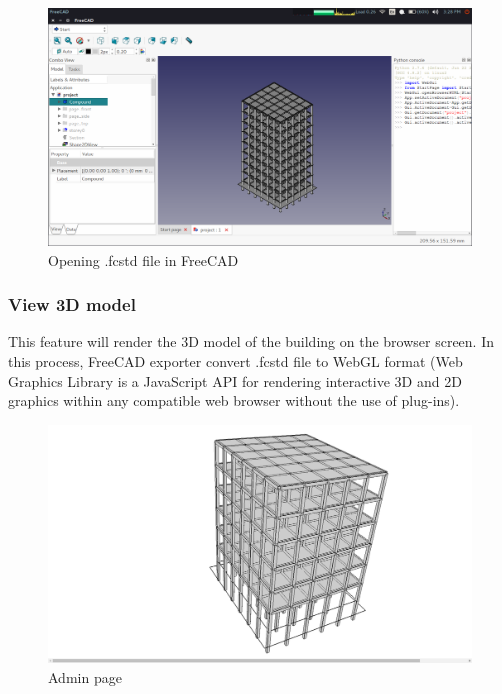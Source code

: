 \begin{figure}[h!]
\begin{center}
\includegraphics[scale=0.35]{images/building_macro.png}
\caption{Opening .fcstd file in FreeCAD}
\label{si7}  
\end{center}
\end{figure}

\subsubsection{View 3D model}
This feature will render the 3D model of the building on the browser screen. In this process, FreeCAD exporter convert .fcstd file to WebGL format (Web Graphics Library is a JavaScript API for rendering interactive 3D and 2D graphics within any compatible web browser without the use of plug-ins).   

\begin{figure}[h!]                                                      
\begin{center}                                                          
\includegraphics[scale=0.35]{images/3dmodel.png}                        
\caption{Admin page}              
\end{center}                                                            
\end{figure} 

